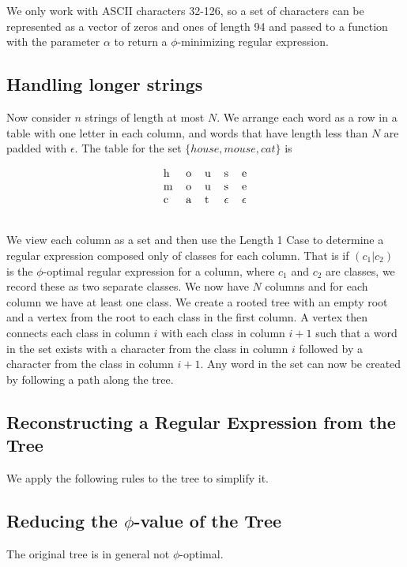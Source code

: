 \documentclass[11pt, oneside]{article}   	%
\theoremstyle{definition}
\begin{document}
We only work with ASCII characters 32-126, so a set of characters can be represented as a vector of zeros and ones of length 94 and passed to a function with the parameter $\alpha$ to return a $\phi$-minimizing regular expression.


\subsection{Handling longer strings}

Now consider $n$ strings of length at most $N$. We arrange each word as a row in a table with one letter in each column, and words that have length less than $N$ are padded with $\epsilon$. 
The table for the set $\{house, mouse, cat\}$ is

\begin{equation}
\begin{tabular}{lllll}
h & o & u & s       & e       \\
m & o & u & s       & e       \\
c & a & t & $\epsilon$ & $\epsilon$ \\
  &   &   &         &        
\end{tabular}
\end{equation}


We view each column as a set and then use the Length 1 Case to determine a regular expression composed only of classes for each column. That is if $(c_1|c_2)$ is the $\phi$-optimal regular expression for a column, where $c_1$ and $c_2$ are classes, we record these as two separate classes. 
We now have $N$ columns and for each column we have at least one class. 
We create a rooted tree with an empty root and a vertex from the root to each class in the first column. 
A vertex then connects each class in column $i$ with each class in column $i+1$ such that a word in the set exists with a character from the class in column $i$ followed by a character from the class in column $i+1$. 
Any word in the set can now be created by following a path along the tree. 


\subsection{Reconstructing a Regular Expression from the Tree}
We apply the following rules to the tree to simplify it. 

\subsection{Reducing the $\phi$-value of the Tree}

The original tree is in general not $\phi$-optimal.
\end{document}
